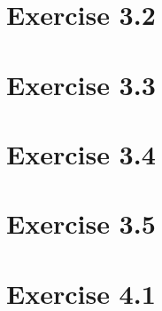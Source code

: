 \documentclass{article}
\begin{document}
\section{Exercise 3.2}

\section{Exercise 3.3}

\section{Exercise 3.4}

\section{Exercise 3.5}


\section{Exercise 4.1}


\end{document}
